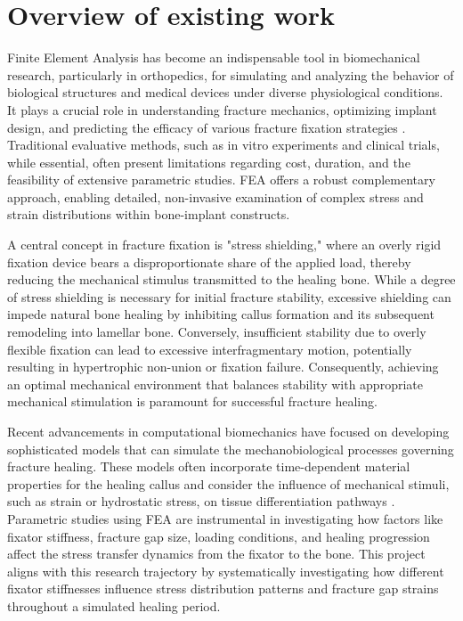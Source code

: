 \documentclass{article}
\begin{document}
\section{Overview of existing work}

Finite Element Analysis has become an indispensable tool in biomechanical research, particularly in orthopedics, for simulating and analyzing the behavior of biological structures and medical devices under diverse physiological conditions. It plays a crucial role in understanding fracture mechanics, optimizing implant design, and predicting the efficacy of various fracture fixation strategies \citep{lewis2021finite}. Traditional evaluative methods, such as in vitro experiments and clinical trials, while essential, often present limitations regarding cost, duration, and the feasibility of extensive parametric studies. FEA offers a robust complementary approach, enabling detailed, non-invasive examination of complex stress and strain distributions within bone-implant constructs.

A central concept in fracture fixation is "stress shielding," where an overly rigid fixation device bears a disproportionate share of the applied load, thereby reducing the mechanical stimulus transmitted to the healing bone. While a degree of stress shielding is necessary for initial fracture stability, excessive shielding can impede natural bone healing by inhibiting callus formation and its subsequent remodeling into lamellar bone. Conversely, insufficient stability due to overly flexible fixation can lead to excessive interfragmentary motion, potentially resulting in hypertrophic non-union or fixation failure. Consequently, achieving an optimal mechanical environment that balances stability with appropriate mechanical stimulation is paramount for successful fracture healing.

Recent advancements in computational biomechanics have focused on developing sophisticated models that can simulate the mechanobiological processes governing fracture healing. These models often incorporate time-dependent material properties for the healing callus and consider the influence of mechanical stimuli, such as strain or hydrostatic stress, on tissue differentiation pathways \citep{morgan2024novel}. Parametric studies using FEA are instrumental in investigating how factors like fixator stiffness, fracture gap size, loading conditions, and healing progression affect the stress transfer dynamics from the fixator to the bone. This project aligns with this research trajectory by systematically investigating how different fixator stiffnesses influence stress distribution patterns and fracture gap strains throughout a simulated healing period.
\end{document}
